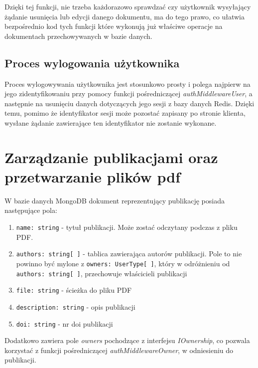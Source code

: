 \documentclass[a4paper,12pt,twoside,openany]{report}
\begin{document}
Dzięki tej funkcji, nie trzeba każdorazowo sprawdzać czy użytkownik wysyłający żądanie usunięcia lub edycji danego dokumentu, ma do tego prawo, co ułatwia bezpośrednio kod tych funkcji które wykonują już właściwe operacje na dokumentach przechowywanych w bazie danych.

\subsection{Proces wylogowania użytkownika}
Proces wylogowywania użytkownika jest stosunkowo prosty i polega najpierw na jego zidentyfikowaniu przy pomocy funkcji pośredniczącej \textit{authMiddlewareUser}, a następnie na usunięciu danych dotyczących jego sesji z bazy danych Redis. Dzięki temu, pomimo że identyfikator sesji może pozostać zapisany po stronie klienta, wysłane żądanie zawierające ten identyfikator nie zostanie wykonane.

\section{Zarządzanie publikacjami oraz przetwarzanie plików pdf}
W bazie danych MongoDB dokument reprezentujący publikację posiada następujące pola: 
\begin{enumerate}
	
	\item \verb|name: string| - tytuł publikacji. Może zostać odczytany podczas  z pliku PDF.
	
	\item \verb|authors: string[ ]| - tablica zawierająca autorów publikacji. Pole to nie powinno być mylone z \verb|owners: UserType[ ]|, który w odróżnieniu od \verb|authors: string[ ]|, przechowuje właścicieli publikacji
	
	\item \verb|file: string| - ścieżka do pliku PDF 
	
	\item \verb|description: string| - opis publikacji
	
	\item \verb|doi: string| - nr doi publikacji
\end{enumerate}
Dodatkowo zawiera pole \textit{owners} pochodzące z interfejsu \textit{IOwnership}, co pozwala korzystać z funkcji pośredniczącej \textit{authMiddlewareOwner}, w odniesieniu do publikacji.
\end{document}
